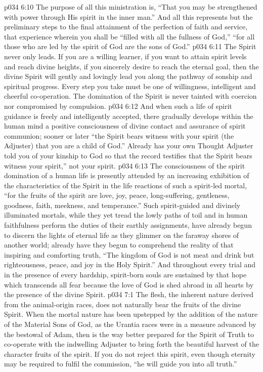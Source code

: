 \vs p034 6:10 The purpose of all this ministration is, “That you may be strengthened with power through His spirit in the inner man.” And all this represents but the preliminary steps to the final attainment of the perfection of faith and service, that experience wherein you shall be “filled with all the fullness of God,” “for all those who are led by the spirit of God are the sons of God.”
\vs p034 6:11 \pc The Spirit never  only leads. If you are a willing learner, if you want to attain spirit levels and reach divine heights, if you sincerely desire to reach the eternal goal, then the divine Spirit will gently and lovingly lead you along the pathway of sonship and spiritual progress. Every step you take must be one of willingness, intelligent and cheerful co\hyp{}operation. The domination of the Spirit is never tainted with coercion nor compromised by compulsion.
\vs p034 6:12 And when such a life of spirit guidance is freely and intelligently accepted, there gradually develops within the human mind a positive consciousness of divine contact and assurance of spirit communion; sooner or later “the Spirit bears witness with your spirit (the Adjuster) that you are a child of God.” Already has your own Thought Adjuster told you of your kinship to God so that the record testifies that the Spirit bears witness  your spirit,” not  your spirit.
\vs p034 6:13 The consciousness of the spirit domination of a human life is presently attended by an increasing exhibition of the characteristics of the Spirit in the life reactions of such a spirit\hyp{}led mortal, “for the fruits of the spirit are love, joy, peace, long\hyp{}suffering, gentleness, goodness, faith, meekness, and temperance.” Such spirit\hyp{}guided and divinely illuminated mortals, while they yet tread the lowly paths of toil and in human faithfulness perform the duties of their earthly assignments, have already begun to discern the lights of eternal life as they glimmer on the faraway shores of another world; already have they begun to comprehend the reality of that inspiring and comforting truth, “The kingdom of God is not meat and drink but righteousness, peace, and joy in the Holy Spirit.” And throughout every trial and in the presence of every hardship, spirit\hyp{}born souls are sustained by that hope which transcends all fear because the love of God is shed abroad in all hearts by the presence of the divine Spirit.
\vs p034 7:1 The flesh, the inherent nature derived from the animal\hyp{}origin races, does not naturally bear the fruits of the divine Spirit. When the mortal nature has been upstepped by the addition of the nature of the Material Sons of God, as the Urantia races were in a measure advanced by the bestowal of Adam, then is the way better prepared for the Spirit of Truth to co\hyp{}operate with the indwelling Adjuster to bring forth the beautiful harvest of the character fruits of the spirit. If you do not reject this spirit, even though eternity may be required to fulfil the commission, “he will guide you into all truth.”
